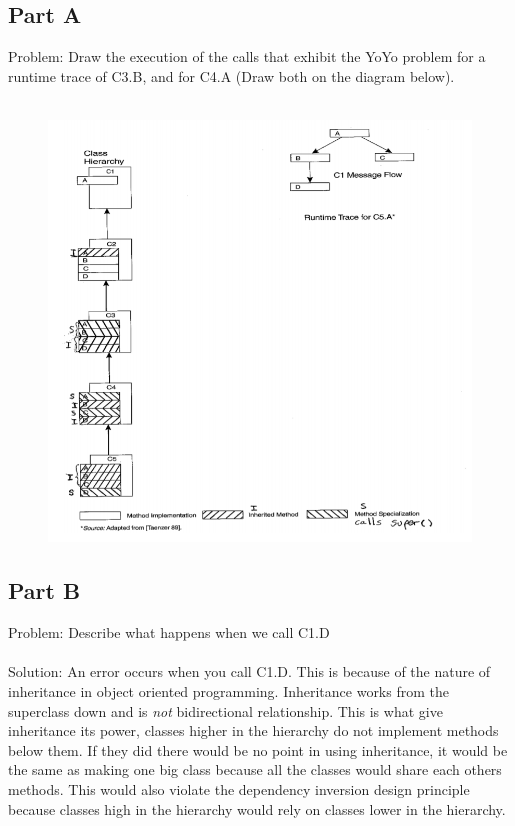 \documentclass{article}
\begin{document}
\subsection*{Part A}
Problem: Draw the execution of the calls that exhibit the YoYo problem for a runtime trace of
C3.B, and for C4.A (Draw both on the diagram below). \\\\
\begin{figure}[h]
	\centering
	\includegraphics[width=6in]{yo-yo-diagram.png}
\end{figure}
\newpage
\subsection*{Part B}
Problem: Describe what happens when we call C1.D \\\\
Solution: An error occurs when you call C1.D. This is because of the nature of inheritance in object oriented programming. Inheritance works from the superclass down and is \textit{not} bidirectional relationship. This is what give inheritance its power, classes higher in the hierarchy do not implement methods below them. If they did there would be no point in using inheritance, it would be the same as making one big class because all the classes would share each others methods. This would also violate the dependency inversion design principle because classes high in the hierarchy would rely on classes lower in the hierarchy.
\end{document}
